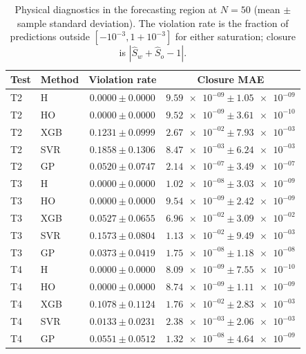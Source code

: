 \begin{table}[H]
\centering
\scriptsize
\setlength{\tabcolsep}{1.5pt}
\caption{Physical diagnostics in the forecasting region at $N=50$ (mean $\pm$ sample standard deviation). The violation rate is the fraction of predictions outside $[-10^{-3},1+10^{-3}]$ for either saturation; closure is $|\widehat S_w+\widehat S_o-1|$.}
\label{tab:physical_diagnostics}
\begin{tabular}{@{}llcc@{}}
\toprule
Test & Method & Violation rate & Closure MAE \\
\midrule
T2 & H & $0.0000\pm0.0000$ & $\num{9.59e-09}\pm\num{1.05e-09}$ \\
T2 & HO & $0.0000\pm0.0000$ & $\num{9.52e-09}\pm\num{3.61e-10}$ \\
T2 & XGB & $0.1231\pm0.0999$ & $\num{2.67e-02}\pm\num{7.93e-03}$ \\
T2 & SVR & $0.1858\pm0.1306$ & $\num{8.47e-03}\pm\num{6.24e-03}$ \\
T2 & GP & $0.0520\pm0.0747$ & $\num{2.14e-07}\pm\num{3.49e-07}$ \\
\addlinespace[1pt]
T3 & H & $0.0000\pm0.0000$ & $\num{1.02e-08}\pm\num{3.03e-09}$ \\
T3 & HO & $0.0000\pm0.0000$ & $\num{9.54e-09}\pm\num{2.42e-09}$ \\
T3 & XGB & $0.0527\pm0.0655$ & $\num{6.96e-02}\pm\num{3.09e-02}$ \\
T3 & SVR & $0.1573\pm0.0804$ & $\num{1.13e-02}\pm\num{9.49e-03}$ \\
T3 & GP & $0.0373\pm0.0419$ & $\num{1.75e-08}\pm\num{1.18e-08}$ \\
\addlinespace[1pt]
T4 & H & $0.0000\pm0.0000$ & $\num{8.09e-09}\pm\num{7.55e-10}$ \\
T4 & HO & $0.0000\pm0.0000$ & $\num{8.74e-09}\pm\num{1.11e-09}$ \\
T4 & XGB & $0.1078\pm0.1124$ & $\num{1.76e-02}\pm\num{2.83e-03}$ \\
T4 & SVR & $0.0133\pm0.0231$ & $\num{2.38e-03}\pm\num{2.06e-03}$ \\
T4 & GP & $0.0551\pm0.0512$ & $\num{1.32e-08}\pm\num{4.64e-09}$ \\
\bottomrule
\end{tabular}
\end{table}
